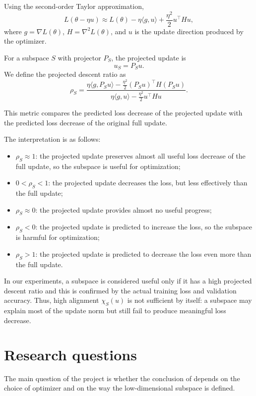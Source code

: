 \documentclass[conference]{IEEEtran}
\begin{document}
Using the second-order Taylor approximation,
\[
L(\theta-\eta u)
\approx
L(\theta)
-
\eta \langle g, u\rangle
+
\frac{\eta^2}{2}u^\top H u,
\]
where \(g=\nabla L(\theta)\), \(H=\nabla^2L(\theta)\), and \(u\) is the update direction produced by the optimizer.

For a subspace \(S\) with projector \(P_S\), the projected update is
\[
u_S = P_S u.
\]
We define the projected descent ratio as
\[
\rho_S
=
\frac{
\eta \langle g, P_Su\rangle
-
\frac{\eta^2}{2}(P_Su)^\top H(P_Su)
}{
\eta \langle g, u\rangle
-
\frac{\eta^2}{2}u^\top H u
}.
\]

This metric compares the predicted loss decrease of the projected update with the predicted loss decrease of the original full update.

The interpretation is as follows:
\begin{itemize}
    \item \(\rho_S \approx 1\): the projected update preserves almost all useful loss decrease of the full update, so the subspace is useful for optimization;
    \item \(0 < \rho_S < 1\): the projected update decreases the loss, but less effectively than the full update;
    \item \(\rho_S \approx 0\): the projected update provides almost no useful progress;
    \item \(\rho_S < 0\): the projected update is predicted to increase the loss, so the subspace is harmful for optimization;
    \item \(\rho_S > 1\): the projected update is predicted to decrease the loss even more than the full update.
\end{itemize}

In our experiments, a subspace is considered useful only if it has a high projected descent ratio and this is confirmed by the actual training loss and validation accuracy. Thus, high alignment \(\chi_S(u)\) is not sufficient by itself: a subspace may explain most of the update norm but still fail to produce meaningful loss decrease.

\section{Research questions}

The main question of the project is whether the conclusion of \citet{SongDoesSGD} depends on the choice of optimizer and on the way the low-dimensional subspace is defined.
\end{document}
